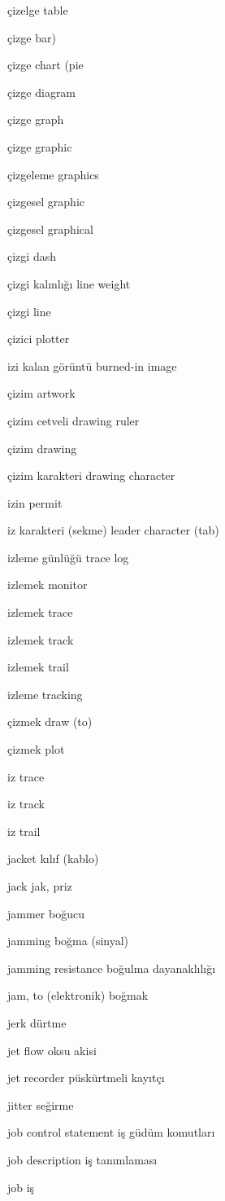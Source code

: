 \documentclass[12pt,fleqn]{article}\usepackage{../../common}
\begin{document}
çizelge table

çizge bar)

çizge chart (pie

çizge diagram

çizge graph

çizge graphic

çizgeleme graphics

çizgesel graphic

çizgesel graphical

çizgi dash

çizgi kalınlığı line weight

çizgi line

çizici plotter

izi kalan görüntü burned-in image

çizim artwork

çizim cetveli drawing ruler

çizim drawing

çizim karakteri drawing character

izin permit

iz karakteri (sekme) leader character (tab)

izleme günlüğü trace log

izlemek monitor

izlemek trace

izlemek track

izlemek trail

izleme tracking

çizmek draw (to)

çizmek plot

iz trace

iz track

iz trail

jacket kılıf (kablo)

jack jak, priz

jammer boğucu

jamming boğma (sinyal)

jamming resistance boğulma dayanaklılığı

jam, to (elektronik) boğmak

jerk dürtme

jet flow oksu akisi

jet recorder püskürtmeli kayıtçı

jitter seğirme

job control statement iş güdüm komutları

job description iş tanımlaması

job iş
\end{document}
